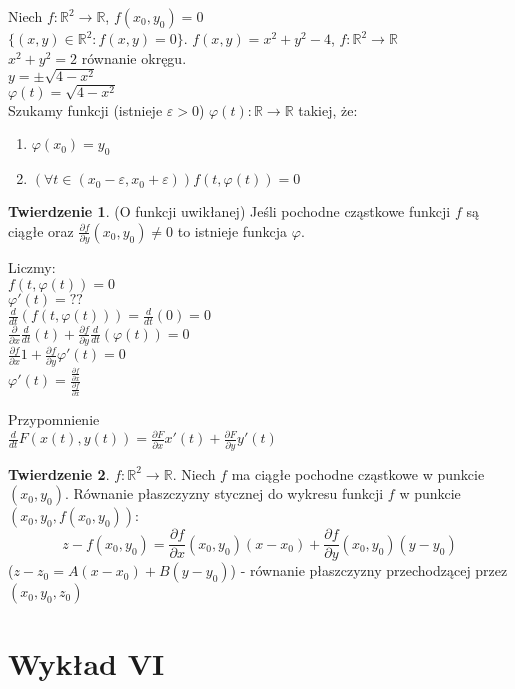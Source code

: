 \documentclass{article}
\theoremstyle{definition}
\theoremstyle{definition}
\newtheorem{tw}{Twierdzenie}[subsection]
\theoremstyle{definition}
\theoremstyle{definition}
\theoremstyle{definition}
\theoremstyle{definition}
\theoremstyle{definition}
\begin{document}
Niech $f: \mathbb{R}^2\rightarrow\mathbb{R}$, $f(x_0,y_0)=0$\\
$\{(x,y)\in\mathbb{R}^2 : f(x,y)=0\}$. $f(x,y)=x^2+y^2-4$, $f:\mathbb{R}^2\rightarrow \mathbb{R}$\\
$x^2+y^2=2$ równanie okręgu.\\
$y=\pm \sqrt{4-x^2}$\\
$\varphi(t)=\sqrt{4-x^2}$\\
Szukamy funkcji (istnieje $\varepsilon > 0$)
$\varphi(t): \mathbb{R}\rightarrow\mathbb{R}$ takiej, że:
\begin{enumerate}
    \item $\varphi(x_0) = y_0$
    \item $\left(\forall t\in(x_0 - \varepsilon, x_0 + \varepsilon)\right) f(t,\varphi(t))=0$
\end{enumerate}

\begin{tw}
    (O funkcji uwikłanej) Jeśli pochodne cząstkowe funkcji $f$ są ciągłe oraz $\frac{\partial f}{\partial y} (x_0,y_0) \neq 0$ to istnieje funkcja $\varphi$.
\end{tw}
Liczmy:\\
$f(t,\varphi(t)) = 0$\\
$\varphi'(t)=??$\\
$\frac{d}{dt} \left(f(t,\varphi(t)) \right) = \frac{d}{dt} (0) = 0$\\
$\frac{\partial}{\partial x} \frac{d}{dt} (t) + \frac{\partial f}{\partial y} \frac{d}{dt} (\varphi(t)) = 0$\\
$\frac{\partial f}{\partial x} 1 + \frac{\partial f}{\partial y} \varphi'(t)= 0$\\
$\varphi'(t) = \frac{\frac{\partial f}{\partial x}}{\frac{\partial f}{\partial x}}$

Przypomnienie\\
$\frac{d}{dt} F(x(t),y(t)) = \frac{\partial F}{\partial x} x'(t) + \frac{\partial F}{\partial y} y'(t)$

\begin{tw}
    $f: \mathbb{R}^2 \rightarrow \mathbb{R}$. Niech $f$ ma ciągłe pochodne cząstkowe w punkcie $(x_0,y_0)$. Równanie płaszczyzny
    stycznej do wykresu funkcji $f$ w punkcie $(x_0,y_0,f(x_0,y_0))$:
    \[z-f(x_0,y_0)=\frac{\partial f}{\partial x} (x_0,y_0) (x-x_0) + \frac{\partial f}{\partial y} (x_0,y_0) (y-y_0)\]
    ($z-z_0=A(x-x_0)+B(y-y_0)$) - równanie płaszczyzny przechodzącej przez $(x_0,y_0,z_0)$
\end{tw}

\section{Wykład VI}
\end{document}
